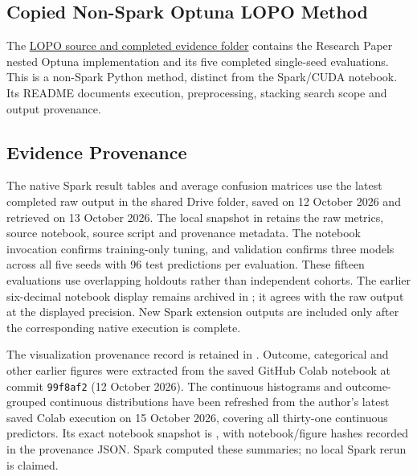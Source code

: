 \subsection{Copied Non-Spark Optuna LOPO Method}
The \href{https://github.com/QuyDuong106/INFOSYS722_BDAS/tree/main/iteration4_BDAS/LOPO}{LOPO source and completed evidence folder} contains the Research Paper nested Optuna implementation and its five completed single-seed evaluations. This is a non-Spark Python method, distinct from the Spark/CUDA notebook. Its README documents execution, preprocessing, stacking search scope and output provenance.

\subsection{Evidence Provenance}
The native Spark result tables and average confusion matrices use the latest completed raw  output in the shared Drive folder, saved on 12 October 2026 and retrieved on 13 October 2026. The local snapshot in  retains the raw metrics, source notebook, source script and provenance metadata. The notebook invocation confirms training-only tuning, and validation confirms three models across all five seeds with 96 test predictions per evaluation. These fifteen evaluations use overlapping holdouts rather than independent cohorts. The earlier six-decimal notebook display remains archived in ; it agrees with the raw output at the displayed precision. New Spark extension outputs are included only after the corresponding native execution is complete.

The visualization provenance record is retained in . Outcome, categorical and other earlier figures were extracted from the saved GitHub Colab notebook at commit \texttt{99f8af2} (12 October 2026). The continuous histograms and outcome-grouped continuous distributions have been refreshed from the author's latest saved Colab execution on 15 October 2026, covering all thirty-one continuous predictors. Its exact notebook snapshot is , with notebook/figure hashes recorded in the provenance JSON. Spark computed these summaries; no local Spark rerun is claimed.
